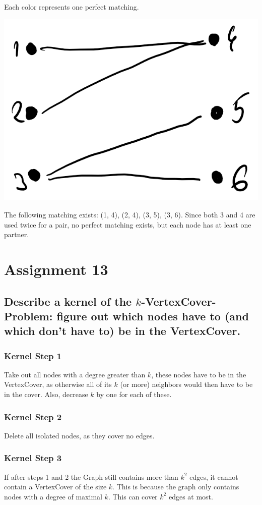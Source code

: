 \documentclass[runningheads]{llncs}
\begin{document}
Each color represents one perfect matching.

\includegraphics[scale=0.5]{./resources/graph_4}

The following matching exists: (1, 4), (2, 4), (3, 5), (3, 6). Since both 3 and 4 are used twice for a pair, no perfect matching exists, but each node has at least one partner.

\section*{Assignment 13}

\subsection*{Describe a kernel of the $k$-VertexCover-Problem: figure out which nodes have to (and which don’t have to) be in the VertexCover.}

\subsubsection*{Kernel Step 1} Take out all nodes with a degree greater than $k$, these nodes have to be in the VertexCover, as otherwise all of its $k$ (or more) neighbors would then have to be in the cover. Also, decrease $k$ by one for each of these.
\subsubsection*{Kernel Step 2} Delete all isolated nodes, as they cover no edges.
\subsubsection*{Kernel Step 3} If after steps 1 and 2 the Graph still contains more than $k^2$ edges, it cannot contain a VertexCover of the size $k$. This is because the graph only contains nodes with a degree of maximal $k$. This can cover $k^2$ edges at most.
\end{document}
